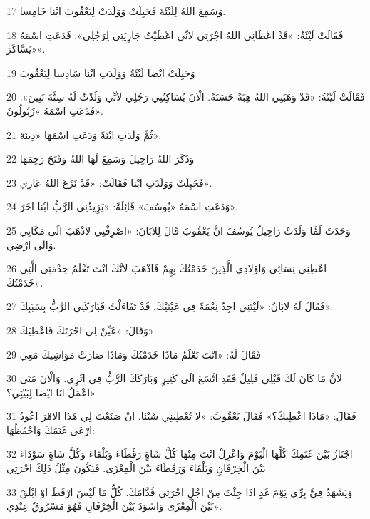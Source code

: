 \par 17 وَسَمِعَ اللهُ لِلَيْئَةَ فَحَبِلَتْ وَوَلَدَتْ لِيَعْقُوبَ ابْنا خَامِسا.
\par 18 فَقَالَتْ لَيْئَةُ: «قَدْ اعْطَانِي اللهُ اجْرَتِي لانِّي اعْطَيْتُ جَارِيَتِي لِرَجُلِي». فَدَعَتِ اسْمَهُ «يَسَّاكَرَ».
\par 19 وَحَبِلَتْ ايْضا لَيْئَةُ وَوَلَدَتِ ابْنا سَادِسا لِيَعْقُوبَ
\par 20 فَقَالَتْ لَيْئَةُ: «قَدْ وَهَبَنِي اللهُ هِبَةً حَسَنَةً. الْانَ يُسَاكِنُنِي رَجُلِي لانِّي وَلَدْتُ لَهُ سِتَّةَ بَنِينَ». فَدَعَتِ اسْمَهُ «زَبُولُونَ».
\par 21 ثُمَّ وَلَدَتِ ابْنَةً وَدَعَتِ اسْمَهَا «دِينَةَ».
\par 22 وَذَكَرَ اللهُ رَاحِيلَ وَسَمِعَ لَهَا اللهُ وَفَتَحَ رَحِمَهَا
\par 23 فَحَبِلَتْ وَوَلَدَتِ ابْنا فَقَالَتْ: «قَدْ نَزَعَ اللهُ عَارِي».
\par 24 وَدَعَتِ اسْمَهُ «يُوسُفَ» قَائِلَةً: «يَزِيدُنِي الرَّبُّ ابْنا اخَرَ».
\par 25 وَحَدَثَ لَمَّا وَلَدَتْ رَاحِيلُ يُوسُفَ انَّ يَعْقُوبَ قَالَ لِلابَانَ: «اصْرِفْنِي لاذْهَبَ الَى مَكَانِي وَالَى ارْضِي.
\par 26 اعْطِنِي نِسَائِي وَاوْلادِي الَّذِينَ خَدَمْتُكَ بِهِمْ فَاذْهَبَ لانَّكَ انْتَ تَعْلَمُ خِدْمَتِي الَّتِي خَدَمْتُكَ».
\par 27 فَقَالَ لَهُ لابَانُ: «لَيْتَنِي اجِدُ نِعْمَةً فِي عَيْنَيْكَ. قَدْ تَفَاءَلْتُ فَبَارَكَنِي الرَّبُّ بِسَبَبِكَ».
\par 28 وَقَالَ: «عَيِّنْ لِي اجْرَتَكَ فَاعْطِيَكَ».
\par 29 فَقَالَ لَهُ: «انْتَ تَعْلَمُ مَاذَا خَدَمْتُكَ وَمَاذَا صَارَتْ مَوَاشِيكَ مَعِي
\par 30 لانَّ مَا كَانَ لَكَ قَبْلِي قَلِيلٌ فَقَدِ اتَّسَعَ الَى كَثِيرٍ وَبَارَكَكَ الرَّبُّ فِي اثَرِي. وَالْانَ مَتَى اعْمَلُ انَا ايْضا لِبَيْتِي؟»
\par 31 فَقَالَ: «مَاذَا اعْطِيكَ؟» فَقَالَ يَعْقُوبُ: «لا تُعْطِينِي شَيْئا. انْ صَنَعْتَ لِي هَذَا الامْرَ اعُودُ ارْعَى غَنَمَكَ وَاحْفَظُهَا:
\par 32 اجْتَازُ بَيْنَ غَنَمِكَ كُلِّهَا الْيَوْمَ وَاعْزِلْ انْتَ مِنْهَا كُلَّ شَاةٍ رَقْطَاءَ وَبَلْقَاءَ وَكُلَّ شَاةٍ سَوْدَاءَ بَيْنَ الْخِرْفَانِ وَبَلْقَاءَ وَرَقْطَاءَ بَيْنَ الْمِعْزَى. فَيَكُونَ مِثْلُ ذَلِكَ اجْرَتِي
\par 33 وَيَشْهَدُ فِيَّ بِرِّي يَوْمَ غَدٍ اذَا جِئْتَ مِنْ اجْلِ اجْرَتِي قُدَّامَكَ. كُلُّ مَا لَيْسَ ارْقَطَ اوْ ابْلَقَ بَيْنَ الْمِعْزَى وَاسْوَدَ بَيْنَ الْخِرْفَانِ فَهُوَ مَسْرُوقٌ عِنْدِي».
